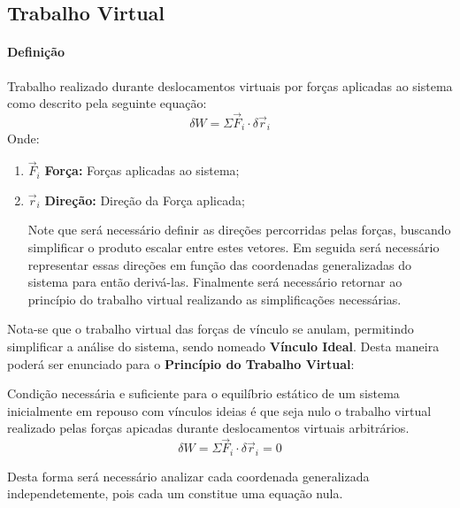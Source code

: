 \documentclass{article}
\begin{document}
        \subsection{Trabalho Virtual}
            \paragraph{Definição}Trabalho realizado durante deslocamentos virtuais por forças aplicadas ao sistema como descrito pela seguinte equação:
                \begin{equation}
                    \boxed{
                        \delta W = 
                        \Sigma\vec{F}_{i} \cdot \delta\vec{r}_{i}
                    }
                \end{equation}
            Onde:
                \begin{enumerate}[rightmargin = \leftmargin, noitemsep]
                    \item $\vec{F}_{i}$ \textbf{Força:} Forças aplicadas ao sistema;

                    \item $\vec{r}_{i}$ \textbf{Direção:} Direção da Força aplicada;

                    Note que será necessário definir as direções percorridas pelas forças, buscando simplificar o produto escalar entre estes vetores. Em seguida será necessário representar essas direções em função das coordenadas generalizadas do sistema para então derivá-las. Finalmente será necessário retornar ao princípio do trabalho virtual realizando as simplificações necessárias.
                \end{enumerate}
            Nota-se que o trabalho virtual das forças de vínculo se anulam, permitindo simplificar a análise do sistema, sendo nomeado \textbf{Vínculo Ideal}. Desta maneira poderá ser enunciado para o \textbf{Princípio do Trabalho Virtual}:
                \begin{displayquote}[][]
                    Condição necessária e suficiente para o equilíbrio estático de um sistema inicialmente em repouso com vínculos ideias é que seja nulo o trabalho virtual realizado pelas forças apicadas durante deslocamentos virtuais arbitrários.
                    \begin{equation}
                        \boxed{
                            \delta W = 
                            \Sigma\vec{F}_{i} \cdot \delta\vec{r}_{i} = 
                            0
                        }
                    \end{equation}
                \end{displayquote}
            Desta forma será necessário analizar cada coordenada generalizada independetemente, pois cada um constitue uma equação nula.
\end{document}
